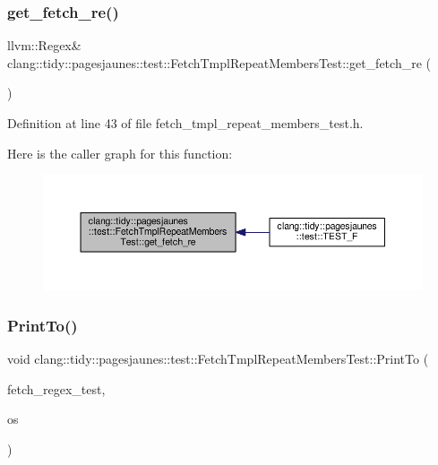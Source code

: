 \subsubsection{\texorpdfstring{get\+\_\+fetch\+\_\+re()}{get\_fetch\_re()}}
{\footnotesize\ttfamily llvm\+::\+Regex\& clang\+::tidy\+::pagesjaunes\+::test\+::\+Fetch\+Tmpl\+Repeat\+Members\+Test\+::get\+\_\+fetch\+\_\+re (\begin{DoxyParamCaption}{ }\end{DoxyParamCaption})\hspace{0.3cm}{\ttfamily [inline]}}



Definition at line 43 of file fetch\+\_\+tmpl\+\_\+repeat\+\_\+members\+\_\+test.\+h.

Here is the caller graph for this function\+:
\nopagebreak
\begin{figure}[H]
\begin{center}
\leavevmode
\includegraphics[width=350pt]{classclang_1_1tidy_1_1pagesjaunes_1_1test_1_1_fetch_tmpl_repeat_members_test_a433c406472c31bb1edef60df46505aab_icgraph}
\end{center}
\end{figure}
\mbox{\label{classclang_1_1tidy_1_1pagesjaunes_1_1test_1_1_fetch_tmpl_repeat_members_test_aea676e3f0463e3817a8e7521ec102dc0}} 
\subsubsection{\texorpdfstring{Print\+To()}{PrintTo()}}
{\footnotesize\ttfamily void clang\+::tidy\+::pagesjaunes\+::test\+::\+Fetch\+Tmpl\+Repeat\+Members\+Test\+::\+Print\+To (\begin{DoxyParamCaption}\item[{const \hyperlink{classclang_1_1tidy_1_1pagesjaunes_1_1test_1_1_fetch_tmpl_repeat_members_test}{Fetch\+Tmpl\+Repeat\+Members\+Test} \&}]{fetch\+\_\+regex\+\_\+test,  }\item[{\+::std\+::ostream $\ast$}]{os }\end{DoxyParamCaption})}



